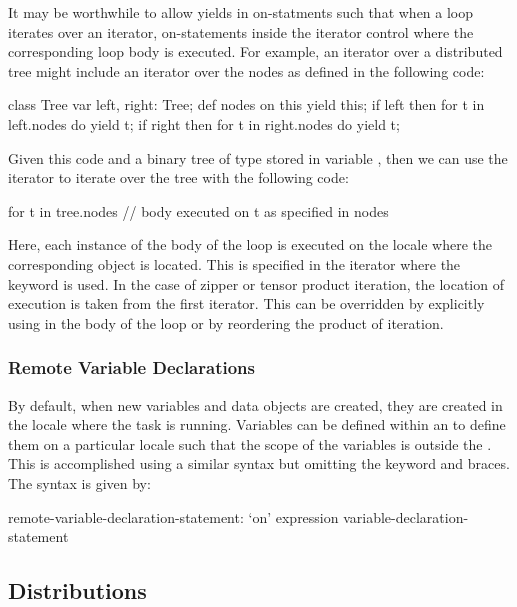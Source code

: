 \begin{openissue}
It may be worthwhile to allow yields in on-statments such that when a
loop iterates over an iterator, on-statements inside the iterator
control where the corresponding loop body is executed.  For example,
an iterator over a distributed tree might include an iterator over the
nodes as defined in the following code:
\begin{chapel}
class Tree {
  var left, right: Tree;
  def nodes {
    on this yield this;
    if left then
      for t in left.nodes do
        yield t;
    if right then
      for t in right.nodes do
        yield t;
  }
}
\end{chapel}
Given this code and a binary tree of type  stored in
variable , then we can use the  iterator to
iterate over the tree with the following code:
\begin{chapel}
for t in tree.nodes {
  // body executed on t as specified in nodes
}
\end{chapel}
Here, each instance of the body of the  loop is executed
on the locale where the corresponding object  is located.
This is specified in the  iterator where the 
keyword is used.  In the case of zipper or tensor product iteration,
the location of execution is taken from the first iterator.  This can
be overridden by explicitly using  in the body of the loop or
by reordering the product of iteration.
\end{openissue}

\subsubsection{Remote Variable Declarations}
\label{remote_variable_declarations}

By default, when new variables and data objects are created, they are
created in the locale where the task is running.  Variables can be
defined within an  to define them on a particular
locale such that the scope of the variables is outside
the .  This is accomplished using a similar syntax
but omitting the  keyword and braces.  The syntax is given
by:
\begin{syntax}
remote-variable-declaration-statement:
  `on' expression variable-declaration-statement
\end{syntax}

\subsection{Distributions}
\label{Distributions}

